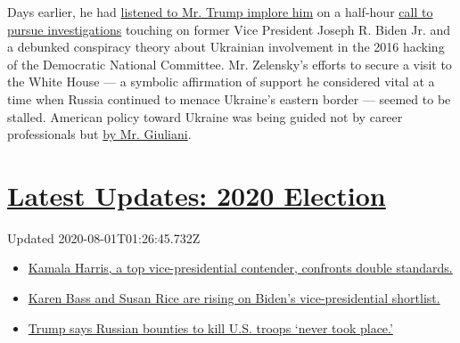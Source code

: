 Days earlier, he had
\href{https://www.nytimes.com/2019/09/25/us/politics/phone-call-transcript-zelensky.html}{listened
to Mr. Trump implore him} on a half-hour
\href{https://www.nytimes.com/interactive/2019/09/25/us/politics/trump-ukraine-transcript.html}{call
to pursue investigations} touching on former Vice President Joseph R.
Biden Jr. and a debunked conspiracy theory about Ukrainian involvement
in the 2016 hacking of the Democratic National Committee. Mr. Zelensky's
efforts to secure a visit to the White House --- a symbolic affirmation
of support he considered vital at a time when Russia continued to menace
Ukraine's eastern border --- seemed to be stalled. American policy
toward Ukraine was being guided not by career professionals but
\href{https://www.nytimes.com/2019/10/04/us/politics/volker-giuliani-ukraine.html}{by
Mr. Giuliani}.

\hypertarget{latest-updates-2020-election}{%
\section{\texorpdfstring{\href{https://www.nytimes.com/2020/07/31/us/elections/biden-vs-trump.html?action=click\&pgtype=Article\&state=default\&region=MAIN_CONTENT_1\&context=storylines_live_updates}{Latest
Updates: 2020
Election}}{Latest Updates: 2020 Election}}\label{latest-updates-2020-election}}

Updated 2020-08-01T01:26:45.732Z

\begin{itemize}
\tightlist
\item
  \href{https://www.nytimes.com/2020/07/31/us/elections/biden-vs-trump.html?action=click\&pgtype=Article\&state=default\&region=MAIN_CONTENT_1\&context=storylines_live_updates\#link-29fdff45}{Kamala
  Harris, a top vice-presidential contender, confronts double
  standards.}
\item
  \href{https://www.nytimes.com/2020/07/31/us/elections/biden-vs-trump.html?action=click\&pgtype=Article\&state=default\&region=MAIN_CONTENT_1\&context=storylines_live_updates\#link-13ec3d9c}{Karen
  Bass and Susan Rice are rising on Biden's vice-presidential
  shortlist.}
\item
  \href{https://www.nytimes.com/2020/07/31/us/elections/biden-vs-trump.html?action=click\&pgtype=Article\&state=default\&region=MAIN_CONTENT_1\&context=storylines_live_updates\#link-49e9a016}{Trump
  says Russian bounties to kill U.S. troops `never took place.'}
\end{itemize}

